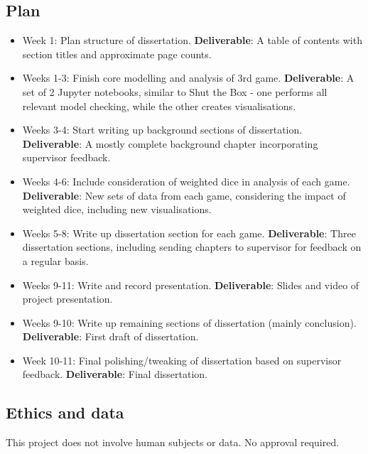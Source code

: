 \documentclass[11pt]{article}
\begin{document}
\subsection{Plan}\label{plan}

\begin{itemize}
    \item Week 1: Plan structure of dissertation. \textbf{Deliverable}: A table of contents with section titles and approximate page counts.
    \item Weeks 1-3: Finish core modelling and analysis of 3rd game. \textbf{Deliverable}: A set of 2 Jupyter notebooks, similar to Shut the Box - one performs all relevant model checking, while the other creates visualisations.
    \item Weeks 3-4: Start writing up background sections of dissertation. \textbf{Deliverable}: A mostly complete background chapter incorporating supervisor feedback.
    \item Weeks 4-6: Include consideration of weighted dice in analysis of each game. \textbf{Deliverable}: New sets of data from each game, considering the impact of weighted dice, including new visualisations.
    \item Weeks 5-8: Write up dissertation section for each game. \textbf{Deliverable}: Three dissertation sections, including sending chapters to supervisor for feedback on a regular basis.
    \item Weeks 9-11: Write and record presentation. \textbf{Deliverable}: Slides and video of project presentation.
    \item Weeks 9-10: Write up remaining sections of dissertation (mainly conclusion). \textbf{Deliverable}: First draft of dissertation.
    \item Week 10-11: Final polishing/tweaking of dissertation based on supervisor feedback. \textbf{Deliverable}: Final dissertation.
\end{itemize}

    
\subsection{Ethics and data}\label{ethics}
This project does not involve human subjects or data. No approval required.
\end{document}

